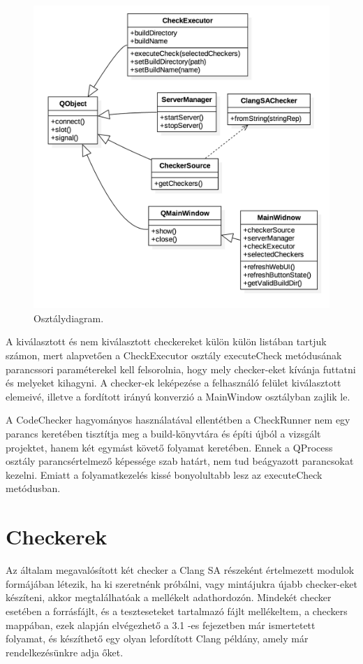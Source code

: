 \documentclass[a4paper,12pt]{report}
\begin{document}
\begin{figure}[h]
\caption{Osztálydiagram.}
\centering
\includegraphics[scale=0.3]{osztalydiagram.png}
\end{figure}

A kiválasztott és nem kiválasztott checkereket külön külön listában tartjuk számon, mert alapvetően a CheckExecutor osztály executeCheck metódusának parancssori paraméterekel kell felsorolnia, hogy mely checker-eket kívánja futtatni és melyeket kihagyni. A checker-ek leképezése a felhasználó felület kiválasztott elemeivé, illetve a fordított irányú konverzió a MainWindow osztályban zajlik le.

A CodeChecker hagyományos használatával ellentétben a CheckRunner nem egy parancs keretében tisztítja meg a build-könyvtára és építi újból a vizsgált projektet, hanem két egymást követő folyamat keretében. Ennek a QProcess osztály parancsértelmező képessége szab határt, nem tud beágyazott parancsokat kezelni. Emiatt a folyamatkezelés kissé bonyolultabb lesz az executeCheck metódusban.

\section{Checkerek}
Az általam megavalósított két checker a Clang SA részeként értelmezett modulok formájában létezik, ha ki szeretnénk próbálni, vagy mintájukra újabb checker-eket készíteni, akkor megtalálhatóak a mellékelt adathordozón. Mindekét checker esetében a forrásfájlt, és a teszteseteket tartalmazó fájlt mellékeltem, a checkers mappában, ezek alapján elvégezhető a 3.1 -es fejezetben már ismertetett folyamat, és készíthető egy olyan lefordított Clang példány, amely már rendelkezésünkre adja őket.
\end{document}
